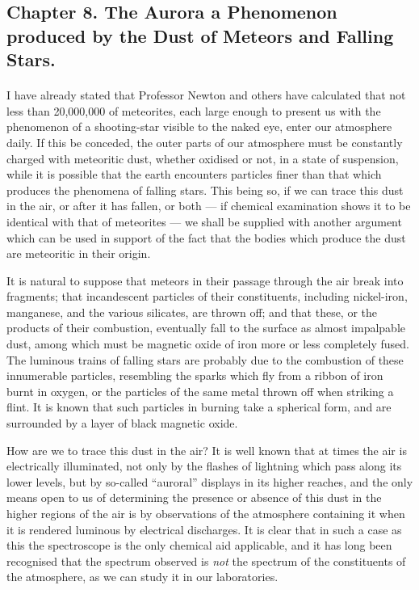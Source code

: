 \documentclass[a4paper, 12pt, oneside, polutonikogreek, english]{article}
\begin{document}
\subsection{Chapter 8. The Aurora a Phenomenon produced by the Dust of Meteors and Falling Stars.}
\paragraph{}
I have already stated that Professor Newton and others have calculated that not less than 20,000,000 of meteorites, each large enough to present us with the phenomenon of a shooting-star visible to the naked eye, enter our atmosphere daily. If this be conceded, the outer parts of our atmosphere must be constantly charged with meteoritic dust, whether oxidised or not, in a state of suspension, while it is possible that the earth encounters particles finer than that which produces the phenomena of falling stars. This being so, if we can trace this dust in the air, or after it has fallen, or both --- if chemical examination shows it to be identical with that of meteorites --- we shall be supplied with another argument which can be used in support of the fact that the bodies which produce the dust are meteoritic in their origin.

It is natural to suppose that meteors in their passage through the air break into fragments; that incandescent particles of their constituents, including nickel-iron, manganese, and the various silicates, are thrown off; and that these, or the products of their combustion, eventually fall to the surface as almost impalpable dust, among which must be magnetic oxide of iron more or less completely fused. The luminous trains of falling stars are probably due to the combustion of these innumerable particles, resembling the sparks which fly from a ribbon of iron burnt in oxygen, or the particles of the same metal thrown off when striking a flint. It is known that such particles in burning take a spherical form, and are surrounded by a layer of black magnetic oxide.

How are we to trace this dust in the air? It is well known that at times the air is electrically illuminated, not only by the flashes of lightning which pass along its lower levels, but by so-called ``auroral'' displays in its higher reaches, and the only means open to us of determining the presence or absence of this dust in the higher regions of the air is by observations of the atmosphere containing it when it is rendered luminous by electrical discharges. It is clear that in such a case as this the spectroscope is the only chemical aid applicable, and it has long been recognised that the spectrum observed is \emph{not} the spectrum of the constituents of the atmosphere, as we can study it in our laboratories.
\end{document}
